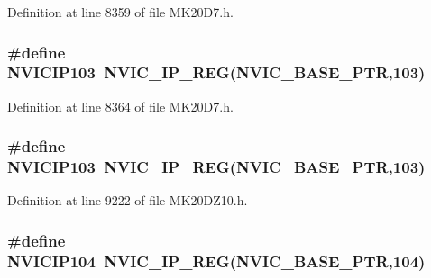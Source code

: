 Definition at line 8359 of file M\+K20\+D7.\+h.

\subsubsection[{\texorpdfstring{N\+V\+I\+C\+I\+P103}{NVICIP103}}]{\setlength{\rightskip}{0pt plus 5cm}\#define N\+V\+I\+C\+I\+P103~{\bf N\+V\+I\+C\+\_\+\+I\+P\+\_\+\+R\+EG}({\bf N\+V\+I\+C\+\_\+\+B\+A\+S\+E\+\_\+\+P\+TR},103)}\hypertarget{group___n_v_i_c___register___accessor___macros_gaf71224e0d8d61e8b017aadc3b24fd7d6}{}\label{group___n_v_i_c___register___accessor___macros_gaf71224e0d8d61e8b017aadc3b24fd7d6}


Definition at line 8364 of file M\+K20\+D7.\+h.

\subsubsection[{\texorpdfstring{N\+V\+I\+C\+I\+P103}{NVICIP103}}]{\setlength{\rightskip}{0pt plus 5cm}\#define N\+V\+I\+C\+I\+P103~{\bf N\+V\+I\+C\+\_\+\+I\+P\+\_\+\+R\+EG}({\bf N\+V\+I\+C\+\_\+\+B\+A\+S\+E\+\_\+\+P\+TR},103)}\hypertarget{group___n_v_i_c___register___accessor___macros_gaf71224e0d8d61e8b017aadc3b24fd7d6}{}\label{group___n_v_i_c___register___accessor___macros_gaf71224e0d8d61e8b017aadc3b24fd7d6}


Definition at line 9222 of file M\+K20\+D\+Z10.\+h.

\subsubsection[{\texorpdfstring{N\+V\+I\+C\+I\+P104}{NVICIP104}}]{\setlength{\rightskip}{0pt plus 5cm}\#define N\+V\+I\+C\+I\+P104~{\bf N\+V\+I\+C\+\_\+\+I\+P\+\_\+\+R\+EG}({\bf N\+V\+I\+C\+\_\+\+B\+A\+S\+E\+\_\+\+P\+TR},104)}\hypertarget{group___n_v_i_c___register___accessor___macros_ga18362cc53f62e519d57a142c1e7a3c6c}{}\label{group___n_v_i_c___register___accessor___macros_ga18362cc53f62e519d57a142c1e7a3c6c}


